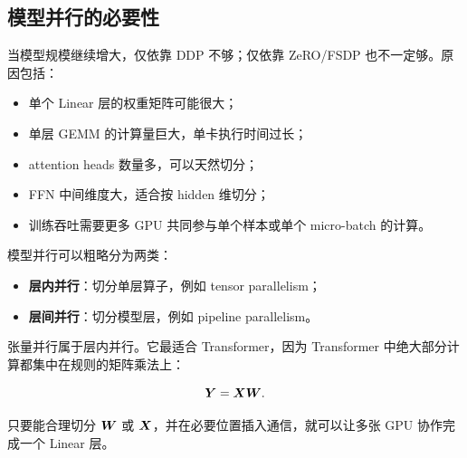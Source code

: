 \subsection{模型并行的必要性}
\label{subsec:necessity-of-model-parallelism}

当模型规模继续增大，仅依靠 DDP 不够；仅依靠 ZeRO/FSDP 也不一定够。原因包括：

\begin{itemize}
\item 单个 Linear 层的权重矩阵可能很大；
\item 单层 GEMM 的计算量巨大，单卡执行时间过长；
\item attention heads 数量多，可以天然切分；
\item FFN 中间维度大，适合按 hidden 维切分；
\item 训练吞吐需要更多 GPU 共同参与单个样本或单个 micro-batch 的计算。
\end{itemize}

模型并行可以粗略分为两类：

\begin{itemize}
\item \textbf{层内并行}：切分单层算子，例如 tensor parallelism；
\item \textbf{层间并行}：切分模型层，例如 pipeline parallelism。
\end{itemize}

张量并行属于层内并行。它最适合 Transformer，因为 Transformer 中绝大部分计算都集中在规则的矩阵乘法上：

\[
\bm{Y}=\bm{X}\bm{W}.
\]

只要能合理切分 $\bm{W}$ 或 $\bm{X}$，并在必要位置插入通信，就可以让多张 GPU 协作完成一个 Linear 层。

